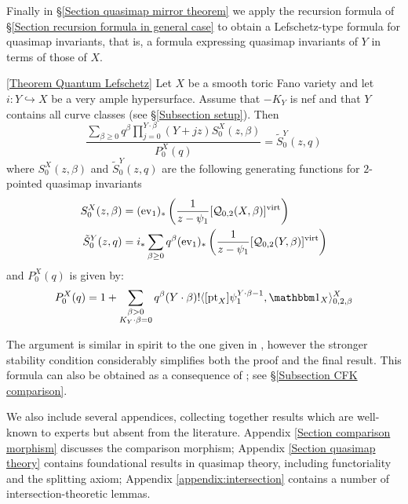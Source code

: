 Finally in \S \ref{Section quasimap mirror theorem} we apply the recursion formula of \S \ref{Section recursion formula in general case} to obtain a Lefschetz-type formula for quasimap invariants, that is, a formula expressing quasimap invariants of $Y$ in terms of those of $X$. 

\begin{customthm}{\ref{Theorem Quantum Lefschetz}}
Let $X$ be a smooth toric Fano variety and let $i\colon Y \hookrightarrow X$ be a very ample hypersurface. Assume that $-K_Y$ is nef and that $Y$ contains all curve classes (see \S \ref{Subsection setup}). Then
\begin{equation*}
\dfrac{\sum_{\beta\geq 0} q^\beta\prod_{j=0}^{Y\cdot\beta}(Y+jz)S_0^X(z,\beta)}{P_0^X(q)}= \tilde{S}_0^Y(z,q)
\end{equation*}
where $S_0^X(z,\beta)$ and $\tilde{S}_0^Y(z,q)$ are the following generating functions for $2$-pointed quasimap invariants
\begin{align*}
S_0^X(z,\beta)&=(\operatorname{ev}_1)_*\left(\frac{1}{z-\psi_1} [\mathcal{Q}_{0,2}(X,\beta)]^{\operatorname{virt}}\right) \\
\tilde{S}_0^Y(z,q)&=i_* \sum_{\beta \geq 0} q^\beta (\operatorname{ev}_1)_*\left(\frac{1}{z-\psi_1} [\mathcal{Q}_{0,2}(Y,\beta)]^{\operatorname{virt}}\right)
\end{align*}
and $P_0^X(q)$ is given by:
\begin{equation*}
P_0^X(q) = 1 + \sum_{\substack{\beta>0 \\ K_Y\cdot\beta=0}} q^\beta(Y\cdot\beta)!\langle [\pt_X] \psi_1^{Y\cdot\beta-1} ,\mathbbm 1_{X}\rangle_{0,2,\beta}^X
\end{equation*}
\end{customthm}

The argument is similar in spirit to the one given in \cite{Ga-MF}, however the stronger stability condition considerably simplifies both the proof and the final result. This formula can also be obtained as a consequence of \cite[Corollary~5.5.1]{CF-K-wallcrossing}; see \S \ref{Subsection CFK comparison}. 

We also include several appendices, collecting together results which are well-known to experts but absent from the literature. Appendix \ref{Section comparison morphism} discusses the comparison morphism; Appendix \ref{Section quasimap theory} contains foundational results in quasimap theory, including functoriality and the splitting axiom; Appendix \ref{appendix:intersection} contains a number of intersection-theoretic lemmas.

